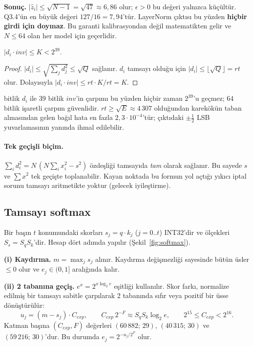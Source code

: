 \noindent\textbf{Sonuç.} $|\hat z_i| \le \sqrt{N-1} = \sqrt{47} \approx 6{,}86$ olur; $\epsilon>0$ bu değeri yalnızca küçültür. Q3.4'ün en büyük değeri $127/16 = 7{,}94$'tür. LayerNorm çıktısı bu yüzden \textbf{hiçbir girdi için doymaz}. Bu garanti kalibrasyondan değil matematikten gelir ve $N \le 64$ olan her model için geçerlidir.

\begin{onerme}\label{on:tasma}
$|d_i\cdot inv| \le K < 2^{39}$.
\end{onerme}
\begin{proof}
$|d_i| \le \sqrt{\sum_j d_j^2} \le \sqrt Q$ sağlanır. $d_i$ tamsayı olduğu için $|d_i| \le \lfloor\sqrt Q\rfloor = rt$ olur. Dolayısıyla $|d_i\cdot inv| \le rt \cdot K/rt = K$.
\end{proof}

 bitlik $d_i$ ile 39 bitlik $inv$'in çarpımı bu yüzden hiçbir zaman $2^{39}$'u geçmez; 64 bitlik işaretli çarpım güvenlidir. $rt \ge \sqrt E \approx 4\,307$ olduğundan karekökün taban almasından gelen bağıl hata en fazla $2{,}3\cdot10^{-4}$'tür; çıktıdaki $\pm\tfrac12$ LSB yuvarlamasının yanında ihmal edilebilir.

\paragraph{Tek geçişli biçim.} $\sum_i d_i^2 = N\,(N\sum_i x_i^2 - s^2)$ özdeşliği tamsayıda \emph{tam} olarak sağlanır. Bu sayede $s$ ve $\sum x^2$ tek geçişte toplanabilir. Kayan noktada bu formun yol açtığı yıkıcı iptal sorunu tamsayı aritmetikte yoktur (gelecek iyileştirme).

\subsection{Tamsayı softmax}
Bir başın $t$ konumundaki skorları $s_j = q\cdot k_j$ ($j = 0..t$) INT32'dir ve ölçekleri $S_s = S_q S_k$'dir. Hesap dört adımda yapılır (Şekil~\ref{fig:softmax}).

\textbf{(i) Kaydırma.} $m = \max_j s_j$ alınır. Kaydırma değişmezliği sayesinde bütün üsler $\le 0$ olur ve $e_j \in (0,1]$ aralığında kalır.

\textbf{(ii) 2 tabanına geçiş.} $e^x = 2^{x\log_2 e}$ eşitliği kullanılır. Skor farkı, normalize edilmiş bir tamsayı sabitle çarpılarak 2 tabanında sıfır veya pozitif bir üsse dönüştürülür:
\begin{equation}
  u_j = (m - s_j)\cdot C_{exp}, \qquad C_{exp}\, 2^{-F} \approx S_q S_k \log_2 e, \qquad 2^{15} \le C_{exp} < 2^{16}.
\end{equation}
Katman başına $(C_{exp}, F)$ değerleri $(60\,882;\,29)$, $(40\,315;\,30)$ ve $(59\,216;\,30)$'dur. Bu durumda $e_j = 2^{-u_j/2^F}$ olur.

